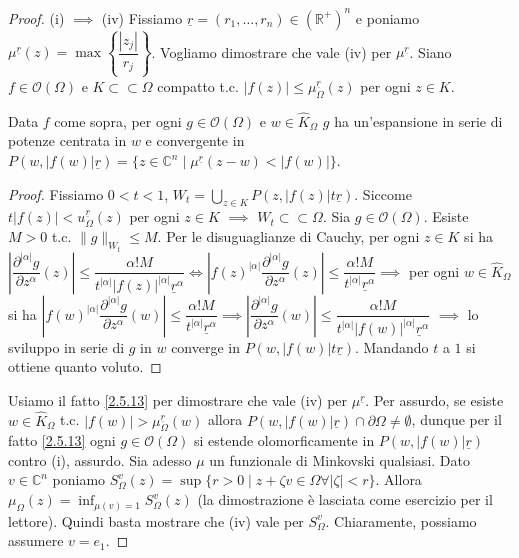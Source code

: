 \begin{proof}
  (i) $\implies$ (iv) Fissiamo $\underline{r}=(r_1,\dots,r_n) \in (\mathbb{R}^+)^n$ e poniamo $\mu^{\underline{r}}(z)=\max\left\{\dfrac{|z_j|}{r_j}\right\}$.
  Vogliamo dimostrare che vale (iv) per $\mu^{\underline{r}}$. Siano $f \in \mathcal{O}(\Omega)$ e $K\subset\subset\Omega$ compatto t.c. $|f(z)| \le \mu_{\Omega}^{\underline{r}}(z)$ per ogni $z \in K$.
  \begin{ftt} \label{2.5.13}
    Data $f$ come sopra, per ogni $g \in \mathcal{O}(\Omega)$ e $w \in \hat{K}_\Omega$ $g$ ha un'espansione in serie di potenze centrata in $w$ e convergente in $P(w, |f(w)|\underline{r})=\{z \in \mathbb{C}^n \mid \mu^{\underline{r}}(z-w)<|f(w)|\}$.
  \end{ftt}
  \begin{proof}
    Fissiamo $0<t<1$, $\displaystyle W_t=\bigcup_{z \in K} P(z, |f(z)|t\underline{r})$. Siccome $t|f(z)|<u_\Omega^{\underline{r}}(z)$ per ogni $z \in K$ $\implies$ $W_t \subset\subset \Omega$. Sia $g \in \mathcal{O}(\Omega)$. Esiste $M>0$ t.c. $\|g\|_{W_t} \le M$.
    Per le disuguaglianze di Cauchy, per ogni $z \in K$ si ha $\left|\dfrac{\partial^{|\alpha|}g}{\partial z^\alpha}(z)\right| \le \dfrac{\alpha!M}{t^{|\alpha|}|f(z)|^{|\alpha|}\underline{r}^\alpha} \iff \left|f(z)^{|\alpha|}\dfrac{\partial^{|\alpha|}g}{\partial z^\alpha}(z)\right| \le \dfrac{\alpha!M}{t^{|\alpha|}\underline{r}^\alpha} \implies$
    per ogni $w \in \hat{K}_\Omega$ si ha $\left|f(w)^{|\alpha|}\dfrac{\partial^{|\alpha|}g}{\partial z^\alpha}(w)\right| \le \dfrac{\alpha!M}{t^{|\alpha|}\underline{r}^\alpha} \implies \left|\dfrac{\partial^{|\alpha|}g}{\partial z^\alpha}(w)\right| \le \dfrac{\alpha!M}{t^{|\alpha|}|f(w)|^{|\alpha|}\underline{r}^\alpha}$ $\implies$
    lo sviluppo in serie di $g$ in $w$ converge in $P(w,|f(w)|t\underline{r})$. Mandando $t$ a $1$ si ottiene quanto voluto.
  \end{proof}
  Usiamo il fatto \ref{2.5.13} per dimostrare che vale (iv) per $\mu^{\underline{r}}$.
  Per assurdo, se esiste $w \in \hat{K}_\Omega$ t.c. $|f(w)|>\mu_\Omega^{\underline{r}}(w)$ allora $P(w,|f(w)|\underline{r}) \cap \partial \Omega \not=\emptyset$, dunque per il fatto \ref{2.5.13} ogni $g \in \mathcal{O}(\Omega)$ si estende olomorficamente in $P(w,|f(w)|\underline{r})$ contro (i), assurdo.
  Sia adesso $\mu$ un funzionale di Minkovski qualsiasi. Dato $v \in \mathbb{C}^n$ poniamo $S^v_\Omega(z)=\sup\{r>0 \mid z+\zeta v \in \Omega \forall |\zeta|<r\}$. Allora $\displaystyle \mu_\Omega(z)=\inf_{\mu(v)=1} S_\Omega^v(z)$ (la dimostrazione è lasciata come esercizio per il lettore). Quindi basta mostrare che (iv) vale per $S^v_\Omega$. Chiaramente, possiamo assumere $v=e_1$.

\end{proof}
